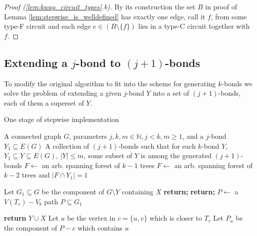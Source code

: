 \begin{proof}[Proof (\ref{lem:kway_circuit_types}.b)]
	By its construction the set $B$ in proof of Lemma \ref{lem:stepwise_is_welldefined} has exactly one edge, call it $f$, from some type-F circuit and each edge $e \in (B \setminus \{f\})$ lies in a type-C circuit together with $f$.
\end{proof}

\subsection*{Extending a $j$-bond to $(j+1)$-bonds}

To modify the original algorithm to fit into the scheme for generating $k$-bonds we solve the problem of extending a given $j$-bond $Y$ into a set of $(j+1)$-bonds, each of them a superset of $Y$.

\begin{algorithm}
	\caption{One stage of stepwise implementation}
	\label{alg:one-stage}
\begin{algorithmic}[1]
	\Require A connected graph $G$, parameters $j, k, m \in \mathbb{N}, j < k, m \geq 1$, and a $j$-bond $Y_1 \subseteq E(G)$
	\Ensure A collection of $(j+1)$-bonds such that for each $k$-bond $Y$, $Y_1 \subseteq Y \subseteq E(G)$, $\lvert Y \rvert \leq m$, some subset of $Y$ is among the generated $(j+1)$-bonds
	 
		\State $F \leftarrow$ an arb. spanning forest of $k-1$ trees
		\Else {}
		\State $F \leftarrow$ an arb. spanning forest of $k-2$ trees and ${\lvert F \cap Y_1 \rvert = 1}$
	\EndIf
		\State {}
	\EndFor

	\State Let $G_1 \subseteq G$ be the component of $G \setminus Y$ containing $X$
		\State \textbf{return;}
	\EndIf
		\State \textbf{return;}
	\EndIf
	\State $P \leftarrow$ a $V(T_r){-}V_b$ path $P \subseteq G_1$

		\State \textbf{return} $Y \cup X$ 
	\Else
			\State Let $u$ be the vertex in $c = \{u,v\}$ which is closer to $T_r$
			\State Let $P_u$ be the component of $P - c$ which contains $u$
			\State {}
		\EndFor
	\EndIf

	\EndProcedure
\end{algorithmic}
\end{algorithm}

